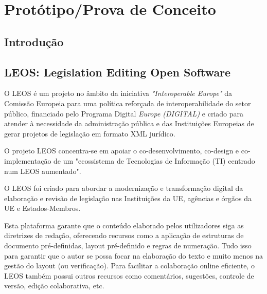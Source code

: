 \chapter{Protótipo/Prova de Conceito}
\label{prototipo}
\section{Introdução}

\section{LEOS: Legislation Editing Open Software}

O LEOS é um projeto no âmbito da iniciativa \emph{"Interoperable Europe"} da Comissão Europeia para uma política reforçada de 
interoperabilidade do setor público, financiado pelo Programa Digital \emph{Europe (DIGITAL)} e criado para atender à 
necessidade da administração pública e das Instituições Europeias de gerar projetos de legislação em formato XML jurídico.

O projeto LEOS concentra-se em apoiar o co-desenvolvimento, co-design e co-implementação de um "ecossistema de Tecnologias de 
Informação (TI) centrado num LEOS aumentado".

O LEOS foi criado para abordar a modernização e transformação digital da elaboração e revisão de legislação nas 
Instituições da UE, agências e órgãos da UE e Estados-Membros.

Esta plataforma garante que o conteúdo elaborado pelos utilizadores siga as diretrizes de redação, oferecendo recursos como a
aplicação de estruturas de documento pré-definidas, layout pré-definido e regras de numeração. 
Tudo isso para garantir que o autor se possa focar na elaboração do texto e muito menos na gestão do layout (ou verificação). 
Para facilitar a colaboração online eficiente, o LEOS também possui outros recursos como comentários, sugestões, 
controle de versão, edição colaborativa, etc.

